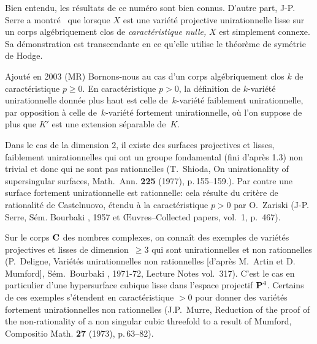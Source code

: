 \begin{remarques}
\label{XI.1.4}
Bien entendu, les r\'esultats de ce num\'ero sont bien
connus. D'autre part,
J-P.\, Serre a montr\'e~\cite{XI.10} que lorsque $X$ est
une vari\'et\'e projective unirationnelle lisse sur un corps
alg\'ebriquement clos de \emph{caractéristique nulle,} $X$ est
simplement connexe. Sa d\'emonstration est transcendante en ce
qu'elle utilise le th\'eor\`eme de sym\'etrie de Hodge.

\lcrochetbf Ajout\'e en 2003 (MR) Bornons-nous au cas d'un corps alg\'ebriquement clos $k$ de
caract\'eristique $p\geq 0$. En caract\'eristique $p>0$, la d\'efinition de
$k$-vari\'et\'e unirationnelle donn\'ee plus haut est celle de~$k$-vari\'et\'e
faiblement unirationnelle, par opposition \`a celle de~$k$-vari\'et\'e
fortement unirationnelle, o\`u l'on suppose de plus que $K'$ est une
extension s\'eparable de~$K$.

Dans le cas de la dimension $2$, il existe des surfaces projectives et
lisses, faiblement unirationnelles qui ont un groupe fondamental (fini
d'apr\`es 1.3) non trivial et donc qui ne sont pas rationnelles (T.\, Shioda, On unirationality of supersingular surfaces, Math.~Ann. \textbf{225}
(1977), p.\,155--159.). Par contre une surface fortement
unirationnelle est rationnelle: cela r\'esulte du crit\`ere de rationalit\'e de
Castelnuovo, \'etendu \`a la caract\'eristique $p>0$ par O.\, Zariski (\cf J-P.\, Serre, S\'em. Bourbaki , 1957 et {\OE}uvres--Collected
papers, vol.\, 1, p.\, 467).

Sur le corps $\mathbf{C}$ des nombres complexes, on conna\^it des exemples de vari\'et\'es projectives et
lisses de \hbox{dimension $\geq 3$} qui sont unirationnelles et non
rationnelles (\cf P.\, Deligne, Vari\'et\'es unirationnelles non
rationnelles [d'apr\`es M.\, Artin et D.\, Mumford],  S\'em.\ Bourbaki
, 1971-72, Lecture Notes vol.\, 317). C'est le cas en particulier d'une
hypersurface cubique lisse dans l'espace projectif $\mathbf{P}^4$.
Certains de ces exemples s'\'etendent en caract\'eristique $>0$ pour donner
des vari\'et\'es fortement unirationnelles non rationnelles (\cf J.P.\, Murre, Reduction of the proof of the non-rationality of a non
singular cubic threefold to a result of Mumford, Compositio Math. \textbf{27}
(1973), p.\,63--82).


\end{remarques}
